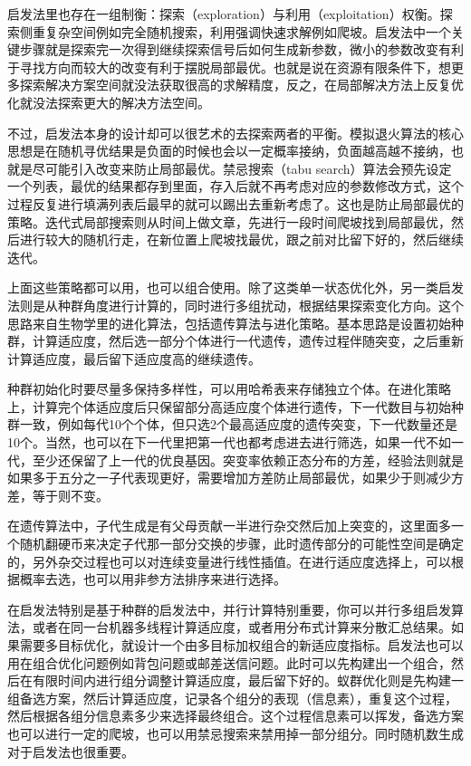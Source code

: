 \documentclass[]{tufte-book}
\begin{document}
启发法里也存在一组制衡：探索（exploration）与利用（exploitation）权衡。探索侧重复杂空间例如完全随机搜索，利用强调快速求解例如爬坡。启发法中一个关键步骤就是探索完一次得到继续探索信号后如何生成新参数，微小的参数改变有利于寻找方向而较大的改变有利于摆脱局部最优。也就是说在资源有限条件下，想更多探索解决方案空间就没法获取很高的求解精度，反之，在局部解决方法上反复优化就没法探索更大的解决方法空间。

不过，启发法本身的设计却可以很艺术的去探索两者的平衡。模拟退火算法的核心思想是在随机寻优结果是负面的时候也会以一定概率接纳，负面越高越不接纳，也就是尽可能引入改变来防止局部最优。禁忌搜索（tabu search）算法会预先设定一个列表，最优的结果都存到里面，存入后就不再考虑对应的参数修改方式，这个过程反复进行填满列表后最早的就可以踢出去重新考虑了。这也是防止局部最优的策略。迭代式局部搜索则从时间上做文章，先进行一段时间爬坡找到局部最优，然后进行较大的随机行走，在新位置上爬坡找最优，跟之前对比留下好的，然后继续迭代。

上面这些策略都可以用，也可以组合使用。除了这类单一状态优化外，另一类启发法则是从种群角度进行计算的，同时进行多组扰动，根据结果探索变化方向。这个思路来自生物学里的进化算法，包括遗传算法与进化策略。基本思路是设置初始种群，计算适应度，然后选一部分个体进行一代遗传，遗传过程伴随突变，之后重新计算适应度，最后留下适应度高的继续遗传。

种群初始化时要尽量多保持多样性，可以用哈希表来存储独立个体。在进化策略上，计算完个体适应度后只保留部分高适应度个体进行遗传，下一代数目与初始种群一致，例如每代10个个体，但只选2个最高适应度的遗传突变，下一代数量还是10个。当然，也可以在下一代里把第一代也都考虑进去进行筛选，如果一代不如一代，至少还保留了上一代的优良基因。突变率依赖正态分布的方差，经验法则就是如果多于五分之一子代表现更好，需要增加方差防止局部最优，如果少于则减少方差，等于则不变。

在遗传算法中，子代生成是有父母贡献一半进行杂交然后加上突变的，这里面多一个随机翻硬币来决定子代那一部分交换的步骤，此时遗传部分的可能性空间是确定的，另外杂交过程也可以对连续变量进行线性插值。在进行适应度选择上，可以根据概率去选，也可以用非参方法排序来进行选择。

在启发法特别是基于种群的启发法中，并行计算特别重要，你可以并行多组启发算法，或者在同一台机器多线程计算适应度，或者用分布式计算来分散汇总结果。如果需要多目标优化，就设计一个由多目标加权组合的新适应度指标。启发法也可以用在组合优化问题例如背包问题或邮差送信问题。此时可以先构建出一个组合，然后在有限时间内进行组分调整计算适应度，最后留下好的。蚁群优化则是先构建一组备选方案，然后计算适应度，记录各个组分的表现（信息素），重复这个过程，然后根据各组分信息素多少来选择最终组合。这个过程信息素可以挥发，备选方案也可以进行一定的爬坡，也可以用禁忌搜索来禁用掉一部分组分。同时随机数生成对于启发法也很重要。
\end{document}
